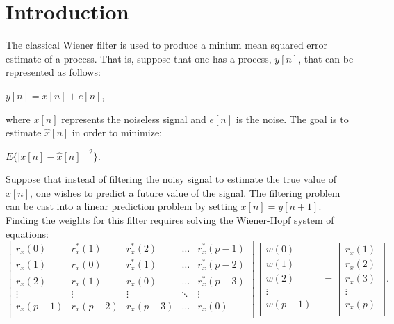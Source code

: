 \documentclass{article}
\begin{document}
\section{Introduction}
The classical Wiener filter is used to produce a minium mean squared error estimate of a process. That is, suppose that one has a process, $y[n]$, that can be represented as follows:\\

\begin{center}
  $y[n] = x[n] + e[n]$,
\end{center}
where $x[n]$ represents the noiseless signal and $e[n]$ is the noise. The goal is to estimate  $\hat{x}[n]$ in order to minimize:\\

\begin{center}
  $E\big\{{\mid x[n] - \hat{x}[n] \mid}^{2} \big\}$.
\end{center}

Suppose that instead of filtering the noisy signal to estimate the true value of $x[n]$, one wishes to predict a future value of the signal. The filtering problem can be cast into a linear prediction problem by setting $x[n] = y[n+1]$. Finding the weights for this filter requires solving the Wiener-Hopf system of equations:\\

\small
\begin{equation}
  \begin{bmatrix}
    r_{x}(0) & r^{*}_{x}(1) & r^{*}_{x}(2) & \dots & r^{*}_{x}(p-1) \\
    r_{x}(1) & r_{x}(0) & r^{*}_{x}(1) & \dots & r^{*}_{x}(p-2) \\
    r_{x}(2) & r_{x}(1) &r_{x}(0) & \dots & r^{*}_{x}(p-3) \\
    \vdots & \vdots & \vdots & \ddots & \vdots \\
    r_{x}(p-1) & r_{x}(p-2) & r_{x}(p-3) & \dots & r_{x}(0) \\
  \end{bmatrix}
  \begin{bmatrix}
    w(0) \\
    w(1) \\
    
    w(2) \\
    \vdots \\
    w(p-1) \\
  \end{bmatrix}
  =
  \begin{bmatrix}
    r_{x}(1) \\
    r_{x}(2) \\
    r_{x}(3) \\
    \vdots \\
    r_{x}(p) \\
  \end{bmatrix}.
\end{equation}
\normalsize
\end{document}
